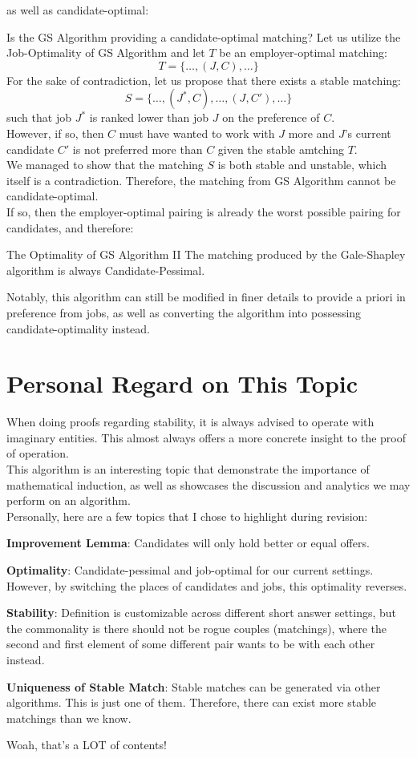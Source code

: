 as well as candidate-optimal:
\begin{ln-think}{Is the GS Algorithm providing a candidate-optimal matching?}{}
    Let us utilize the Job-Optimality of GS Algorithm and let $T$ be an employer-optimal matching:
    \[T = \{\dots, (J, C), \dots\}\]
    For the sake of contradiction, let us propose that there exists a stable matching:
    \[S = \{\dots, (J^*, C), \dots, (J, C'), \dots\}\]
    such that job $J^*$ is ranked lower than job $J$ on the preference of $C$. \\
    However, if so, then $C$ must have wanted to work with $J$ more and $J$'s current candidate $C'$ is not preferred more than $C$ given the stable amtching $T$. \\
    We managed to show that the matching $S$ is both stable and unstable, which itself is a contradiction. Therefore, the matching from GS Algorithm cannot be candidate-optimal. \\
    If so, then the employer-optimal pairing is already the worst possible pairing for candidates, and therefore:
    \begin{ln-theorem}{The Optimality of GS Algorithm II}{}
        The matching produced by the Gale-Shapley algorithm is always Candidate-Pessimal.
    \end{ln-theorem}
\end{ln-think}
Notably, this algorithm can still be modified in finer details to provide a priori in preference from jobs, as well as converting the algorithm into possessing candidate-optimality instead.

\section{Personal Regard on This Topic}
When doing proofs regarding stability, it is always advised to operate with imaginary entities. This almost always offers a more concrete insight to the proof of operation. \\
This algorithm is an interesting topic that demonstrate the importance of mathematical induction, as well as showcases the discussion and analytics we may perform on an algorithm. \\
Personally, here are a few topics that I chose to highlight during revision:
\begin{bindenum}
    \item \textbf{Improvement Lemma}: Candidates will only hold better or equal offers.
    \item \textbf{Optimality}: Candidate-pessimal and job-optimal for our current settings. However, by switching the places of candidates and jobs, this optimality reverses.
    \item \textbf{Stability}: Definition is customizable across different short answer settings, but the commonality is there should not be rogue couples (matchings), where the second and first element of some different pair wants to be with each other instead.
    \item \textbf{Uniqueness of Stable Match}: Stable matches can be generated via other algorithms. This is just one of them. Therefore, there can exist more stable matchings than we know.
\end{bindenum}
Woah, that's a LOT of contents!
